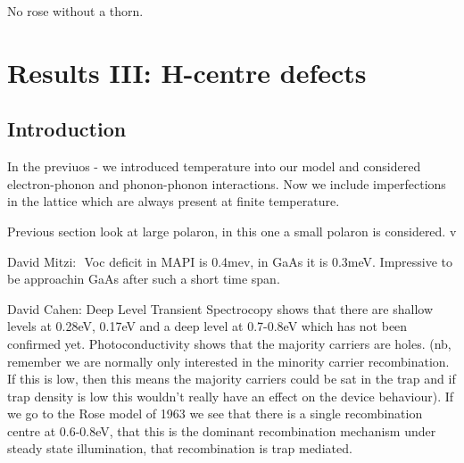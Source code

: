 \begin{savequote}[8cm]
No rose without a thorn.
\end{savequote}

\chapter{\label{ch:6-defects}Results III: H-centre defects}

\section{Introduction}
In the previuos - we introduced temperature into our model and considered electron-phonon and phonon-phonon interactions. Now we include imperfections in the lattice which are always present at finite temperature.

Previous section look at large polaron, in this one a small polaron is considered.
 v

David Mitzi: 
Voc deficit in MAPI is 0.4mev, in GaAs it is 0.3meV. Impressive to be approachin GaAs after such a short time span.


David Cahen: Deep Level Transient Spectrocopy shows that there are shallow levels at 0.28eV, 0.17eV and a deep level at 0.7-0.8eV which has not been confirmed yet.
Photoconductivity shows that the majority carriers are holes. (nb, remember we are normally only interested in the minority carrier recombination. If this is low, then this means the majority carriers could be sat in the trap and if trap density is low this wouldn’t really have an effect on the device behaviour).
If we go to the Rose model of 1963 we see that there is a single recombination centre at 0.6-0.8eV, that this is the dominant recombination mechanism under steady state illumination, that recombination is trap mediated. 

